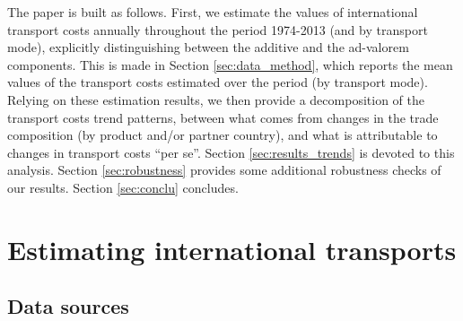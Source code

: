 \documentclass[a4paper,11pt]{article}
\begin{document}
The paper is built as follows. First, we estimate the values of international transport costs annually throughout the period 1974-2013 (and by transport mode), explicitly distinguishing between the additive and the ad-valorem components. This is made in Section \ref{sec:data_method}, which reports the mean values of the transport costs estimated over the period (by transport mode). Relying on these estimation results, we then provide a decomposition of the transport costs trend patterns, between what comes from changes in the trade composition (by product and/or partner country), and what is attributable to changes in transport costs ``per se''. Section \ref{sec:results_trends} is devoted to this analysis. Section \ref{sec:robustness} provides some additional robustness checks of our results. Section \ref{sec:conclu} concludes.


\section{Estimating international transports\label{sec:data_method}}

\subsection{Data sources}
\end{document}
